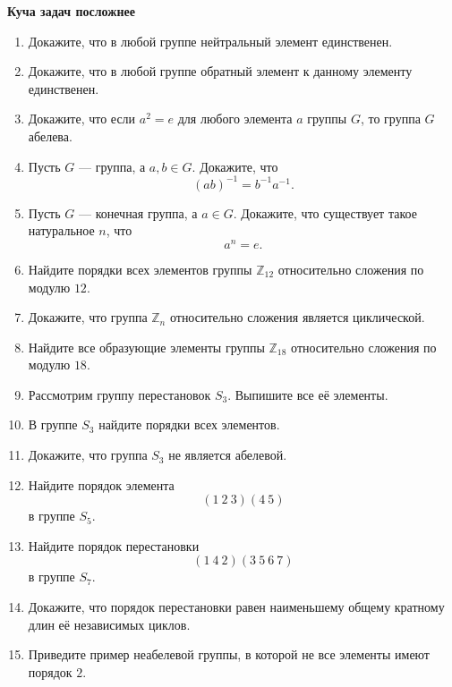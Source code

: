  \textbf{Куча задач посложнее}
\begin{enumerate}
    \item Докажите, что в любой группе нейтральный элемент единственен.

    \item Докажите, что в любой группе обратный элемент к данному элементу единственен.

    \item Докажите, что если \(a^2=e\) для любого элемента \(a\) группы \(G\), то группа \(G\) абелева.

    \item Пусть \(G\) --- группа, а \(a,b\in G\). Докажите, что
    \[
        (ab)^{-1}=b^{-1}a^{-1}.
    \]

    \item Пусть \(G\) --- конечная группа, а \(a\in G\). Докажите, что существует такое натуральное \(n\), что
    \[
        a^n=e.
    \]

    \item Найдите порядки всех элементов группы \(\mathbb Z_{12}\) относительно сложения по модулю \(12\).

    \item Докажите, что группа \(\mathbb Z_n\) относительно сложения является циклической.

    \item Найдите все образующие элементы группы \(\mathbb Z_{18}\) относительно сложения по модулю \(18\).

    \item Рассмотрим группу перестановок \(S_3\). Выпишите все её элементы.

    \item В группе \(S_3\) найдите порядки всех элементов.

    \item Докажите, что группа \(S_3\) не является абелевой.

    \item Найдите порядок элемента
    \[
        (1\ 2\ 3)(4\ 5)
    \]
    в группе \(S_5\).

    \item Найдите порядок перестановки
    \[
        (1\ 4\ 2)(3\ 5\ 6\ 7)
    \]
    в группе \(S_7\).

    \item Докажите, что порядок перестановки равен наименьшему общему кратному длин её независимых циклов.

    \item Приведите пример неабелевой группы, в которой не все элементы имеют порядок \(2\).


\end{enumerate}
